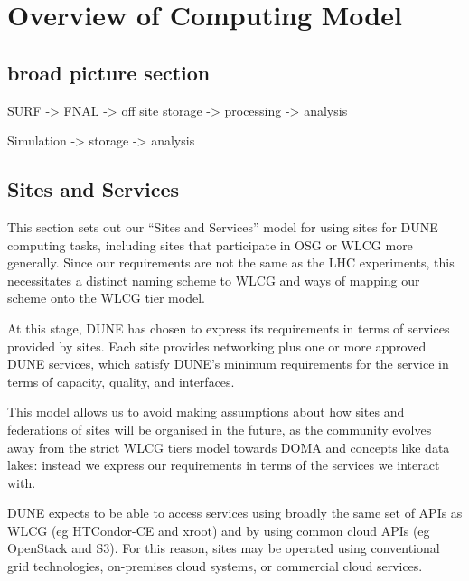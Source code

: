 \chapter{Overview of Computing Model }
\label{ch:cm}

\section{broad picture section}

SURF -> FNAL -> off site storage -> processing -> analysis

Simulation -> storage -> analysis


\section{Sites and Services}
\label{sec:cm:sites_and_services}  %


This section sets out our ``Sites and Services'' model for using sites for DUNE computing tasks, including sites that participate in OSG or WLCG more generally. Since our requirements are not the same as the LHC experiments, this necessitates a distinct naming scheme to WLCG and ways of mapping our scheme onto the WLCG tier model.

At this stage, DUNE has chosen to express its requirements in terms of services provided by sites. Each site provides networking plus one or more approved DUNE services, which satisfy DUNE's minimum requirements for the service in terms of capacity, quality, and interfaces.

This model allows us to avoid making assumptions about how sites and federations of sites will be organised in the future, as the community evolves away from the strict WLCG tiers model towards DOMA and concepts like data lakes: instead we express our requirements in terms of the services we interact with.

DUNE expects to be able to access services using broadly the same set of APIs as WLCG (eg HTCondor-CE and xroot) and by using common cloud APIs (eg OpenStack and S3). For this reason, sites may be operated using conventional grid technologies, on-premises cloud systems, or commercial cloud services.

